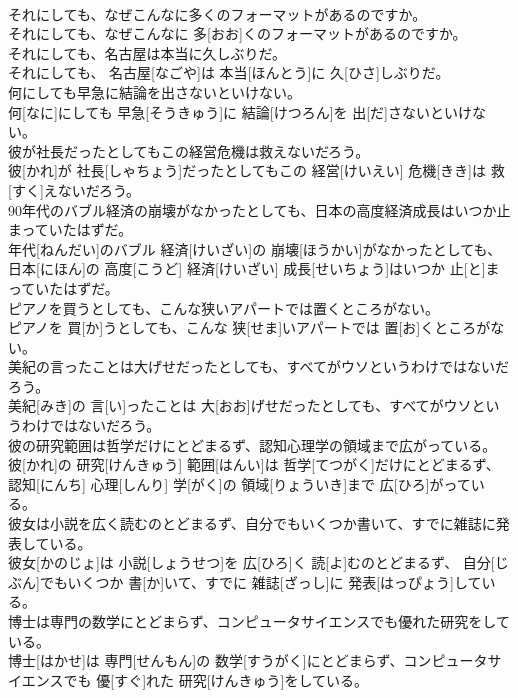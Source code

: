 \documentclass[8pt]{extreport}
\begin{document}
\begin{CJK}{UTF8}{min}
\\	それにしても、なぜこんなに多くのフォーマットがあるのですか。	
\\	それにしても、なぜこんなに 多[おお]くのフォーマットがあるのですか。
\\	それにしても、名古屋は本当に久しぶりだ。	
\\	それにしても、 名古屋[なごや]は 本当[ほんとう]に 久[ひさ]しぶりだ。
\\	何にしても早急に結論を出さないといけない。	
\\	何[なに]にしても 早急[そうきゅう]に 結論[けつろん]を 出[だ]さないといけない。
\\	彼が社長だったとしてもこの経営危機は救えないだろう。	
\\	彼[かれ]が 社長[しゃちょう]だったとしてもこの 経営[けいえい] 危機[きき]は 救[すく]えないだろう。
\\	90年代のバブル経済の崩壊がなかったとしても、日本の高度経済成長はいつか止まっていたはずだ。	
\\	年代[ねんだい]のバブル 経済[けいざい]の 崩壊[ほうかい]がなかったとしても、 日本[にほん]の 高度[こうど] 経済[けいざい] 成長[せいちょう]はいつか 止[と]まっていたはずだ。
\\	ピアノを買うとしても、こんな狭いアパートでは置くところがない。	
\\	ピアノを 買[か]うとしても、こんな 狭[せま]いアパートでは 置[お]くところがない。
\\	美紀の言ったことは大げせだったとしても、すべてがウソというわけではないだろう。	
\\	美紀[みき]の 言[い]ったことは 大[おお]げせだったとしても、すべてがウソというわけではないだろう。
\\	彼の研究範囲は哲学だけにとどまるず、認知心理学の領域まで広がっている。	
\\	彼[かれ]の 研究[けんきゅう] 範囲[はんい]は 哲学[てつがく]だけにとどまるず、 認知[にんち] 心理[しんり] 学[がく]の 領域[りょういき]まで 広[ひろ]がっている。
\\	彼女は小説を広く読むのとどまるず、自分でもいくつか書いて、すでに雑誌に発表している。	
\\	彼女[かのじょ]は 小説[しょうせつ]を 広[ひろ]く 読[よ]むのとどまるず、 自分[じぶん]でもいくつか 書[か]いて、すでに 雑誌[ざっし]に 発表[はっぴょう]している。
\\	博士は専門の数学にとどまらず、コンピュータサイエンスでも優れた研究をしている。	
\\	博士[はかせ]は 専門[せんもん]の 数学[すうがく]にとどまらず、コンピュータサイエンスでも 優[すぐ]れた 研究[けんきゅう]をしている。

\end{CJK}
\end{document}
